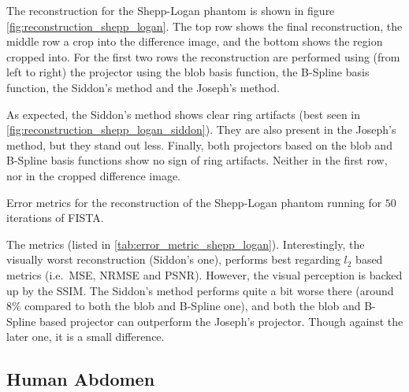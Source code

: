 The reconstruction for the Shepp-Logan phantom is shown in figure
\autoref{fig:reconstruction_shepp_logan}. The top row shows the final reconstruction, the middle row
a crop into the difference image, and the bottom shows the region cropped into. For the first two
rows the reconstruction are performed using (from left to right) the projector using the blob basis
function, the B-Spline basis function, the Siddon's method and the Joseph's method.

As expected, the Siddon's method shows clear ring artifacts (best seen in
\autoref{fig:reconstruction_shepp_logan_siddon}). They are also present in the Joseph's method, but
they stand out less. Finally, both projectors based on the blob and B-Spline basis functions show no
sign of ring artifacts. Neither in the first row, nor in the cropped difference image.

\begin{table}[h]%
	\centering
	\caption{Error metrics for the reconstruction of the Shepp-Logan phantom running for \(50\)
		iterations of FISTA.}%
	\label{tab:error_metric_shepp_logan}
\end{table}

The metrics (listed in \autoref{tab:error_metric_shepp_logan}). Interestingly, the visually worst
reconstruction (Siddon's one), performs best regarding \(l_2\) based metrics (i.e.\ \gls{MSE},
\gls{NRMSE} and \gls{PSNR}). However, the visual perception is backed up by the \gls{SSIM}. The
Siddon's method performs quite a bit worse there (around \(8\%\) compared to both the blob and
B-Spline one), and both the blob and B-Spline based projector can outperform the Joseph's projector.
Though against the later one, it is a small difference.

\subsection{Human Abdomen}

